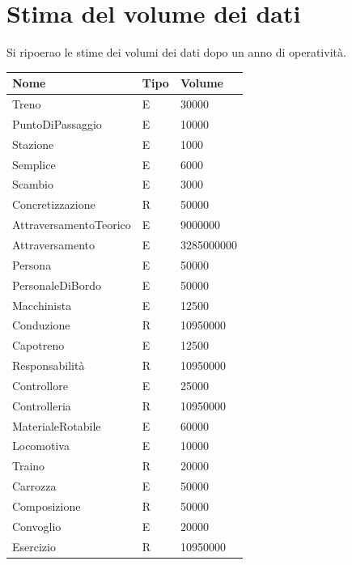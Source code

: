 \documentclass[a4paper,12pt]{report}
\begin{document}
	\section{Stima del volume dei dati}
	\par Si ripoerao le stime dei volumi dei dati dopo un anno di operatività.
	\begin{longtable}{|l|l|l|}
		\hline \textbf{Nome} & \textbf{Tipo} & \textbf{Volume} \\
		\hline \endhead Treno & E & 30000 \\
		\hline PuntoDiPassaggio & E & 10000 \\
		\hline Stazione & E & 1000 \\
		\hline Semplice & E & 6000 \\
		\hline Scambio & E & 3000 \\
		\hline Concretizzazione & R & 50000 \\
		\hline AttraversamentoTeorico & E & 9000000 \\
		\hline Attraversamento & E & 3285000000 \\
		\hline Persona & E & 50000 \\
		\hline PersonaleDiBordo & E & 50000 \\
		\hline Macchinista & E & 12500 \\
		\hline Conduzione & R & 10950000 \\
		\hline Capotreno & E & 12500 \\
		\hline Responsabilit\`a & R & 10950000 \\
		\hline Controllore & E & 25000 \\
		\hline Controlleria & R & 10950000 \\
		\hline MaterialeRotabile & E & 60000 \\
		\hline Locomotiva & E & 10000 \\
		\hline Traino & R & 20000 \\
		\hline Carrozza & E & 50000 \\
		\hline Composizione & R & 50000 \\
		\hline Convoglio & E & 20000 \\
		\hline Esercizio & R & 10950000 \\
		\hline
	\end{longtable}
\end{document}
